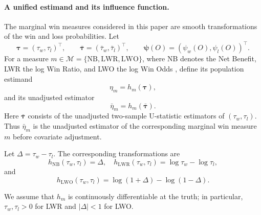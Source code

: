 \documentclass[11pt,a4paper]{article}
\begin{document}


\paragraph{A unified estimand and its influence function.}
The marginal win measures considered in this paper are smooth transformations of the
win and loss probabilities. Let
\[
\boldsymbol\tau=(\tau_w,\tau_l)^\top,
\qquad
\bar{\boldsymbol\tau}=(\bar\tau_w,\bar\tau_l)^\top,
\qquad
\boldsymbol\psi(O)=(\psi_w(O),\psi_l(O))^\top.
\]
For a measure \(m\in\mathcal M=\{\mathrm{NB},\mathrm{LWR},\mathrm{LWO}\}\), where NB denotes the Net Benefit, LWR the log Win Ratio, and LWO the log Win Odds \citep{dong_win_2023, zhang2026forss}, define its population estimand 
\[
\eta_m=h_m(\boldsymbol\tau),
\]
and its unadjusted estimator
\[
\bar\eta_m=h_m(\bar{\boldsymbol\tau}).
\]
Here \(\bar{\boldsymbol\tau}\) consists of the unadjusted two-sample U-statistic estimators
of \((\tau_w,\tau_l)\). Thus \(\bar\eta_m\) is the unadjusted estimator of the
corresponding marginal win measure $m$ before covariate adjustment. 

Let
$
\Delta=\tau_w-\tau_l.
$ The
corresponding transformations are
\[
h_{\mathrm{NB}}(\tau_w,\tau_l)=\Delta,
\quad
h_{\mathrm{LWR}}(\tau_w,\tau_l)=\log\tau_w-\log\tau_l,
\]
and
\[
h_{\mathrm{LWO}}(\tau_w,\tau_l)
=
\log(1+\Delta)
-
\log(1-\Delta).
\]

We assume that \(h_m\) is continuously differentiable at the truth; in particular,
\(\tau_w,\tau_l>0\) for LWR and \(|\Delta|<1\) for LWO.
\end{document}
